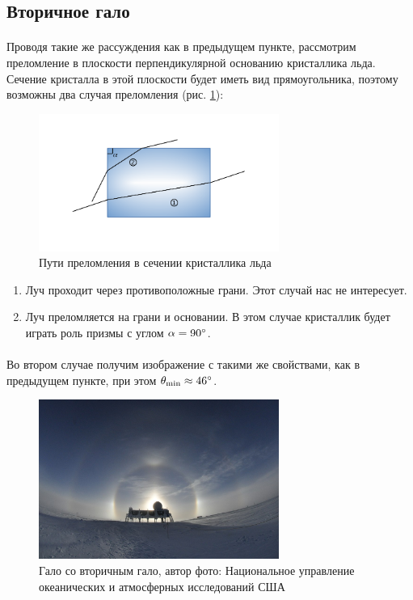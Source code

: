 \documentclass[a4paper,12pt]{article} %
\begin{document}
\subsection{Вторичное гало}

\paragraph{} Проводя такие же рассуждения как в предыдущем пункте, рассмотрим преломление в плоскости перпендикулярной основанию кристаллика льда. Сечение кристалла в этой плоскости будет иметь вид прямоугольника, поэтому возможны два случая преломления (рис. \ref{fig:iceprism2}):

\begin{figure}
\centering
\includegraphics[width=0.7\textwidth]{iceprism2.pdf}
\caption{Пути преломления в сечении кристаллика льда}
\label{fig:iceprism2}
\end{figure}

\begin{enumerate}
\item Луч проходит через противоположные грани. Этот случай нас не интересует.
\item Луч преломляется на грани и основании. В этом случае кристаллик будет играть роль призмы с углом $\alpha = 90\degree$.
\end{enumerate}

\paragraph{} Во втором случае получим изображение с такими же свойствами, как в предыдущем пункте, при этом $\theta_{\min} \approx 46 \degree$. 

\begin{figure}[h]
\centering
\includegraphics[width=0.7\textwidth]{halo_2.jpg}
\caption{\centering Гало со вторичным гало, автор фото: Национальное управление океанических и атмосферных исследований США}
\label{fig:halo_2}
\end{figure}
\end{document}
